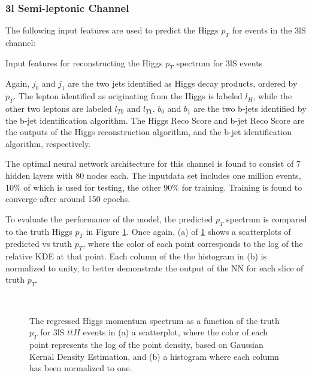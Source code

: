 
\subsubsection{3l Semi-leptonic Channel}
\label{subsec:pt3lS}

The following input features are used to predict the Higgs $p_T$ for events in the 3lS channel:

\begin{table}[H]

  \caption{Input features for reconstructing the Higgs $p_T$ spectrum for 3lS events}
  \label{tab:pt3lSfeatures}
\end{table}

Again, $j_0$ and $j_1$ are the two jets identified as Higgs decay products, ordered by $p_T$. The lepton identified as originating from the Higgs is labeled $l_H$, while the other two leptons are labeled $l_{T0}$ and $l_{T1}$. $b_0$ and $b_1$ are the two b-jets identified by the b-jet identification algorithm. The Higgs Reco Score and b-jet Reco Score are the outputs of the Higgs reconstruction algorithm, and the b-jet identification algorithm, respectively.

The optimal neural network architecture for this channel is found to consist of 7 hidden layers with 80 nodes each. The inputdata set includes one million events, 10\% of which is used for testing, the other 90\% for training. Training is found to converge after around 150 epochs.

To evaluate the performance of the model, the predicted $p_T$ spectrum is compared to the truth Higgs $p_T$ in Figure \ref{fig:pt3lSresults}. Once again, (a) of \ref{fig:pt3lSresults} shows a scatterplots of predicted vs truth $p_T$, where the color of each point corresponds to the log of the relative KDE at that point. Each column of the the histogram in (b) is normalized to unity, to better demonstrate the output of the NN for each slice of truth $p_T$.
                                                                                                                             
\begin{figure}[H]
    \centering
    \\                     
    \caption{The regressed Higgs momentum spectrum as a function of the truth $p_T$ for 3lS $t\bar{t}H$ events in (a) a scatterplot, where the color of each point represents the log of the point density, based on Gaussian Kernal Density Estimation, and (b) a histogram where each column  has been normalized to one.}
    \label{fig:pt3lSresults}
\end{figure}

